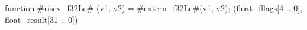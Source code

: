 function #\hyperref[sailRISCVzriscvzyf32Le]{riscv\_f32Le}# (v1, v2) = {
  #\hyperref[sailRISCVzexternzyf32Le]{extern\_f32Le}#(v1, v2);
  (float_fflags[4 .. 0], float_result[31 .. 0])
}
